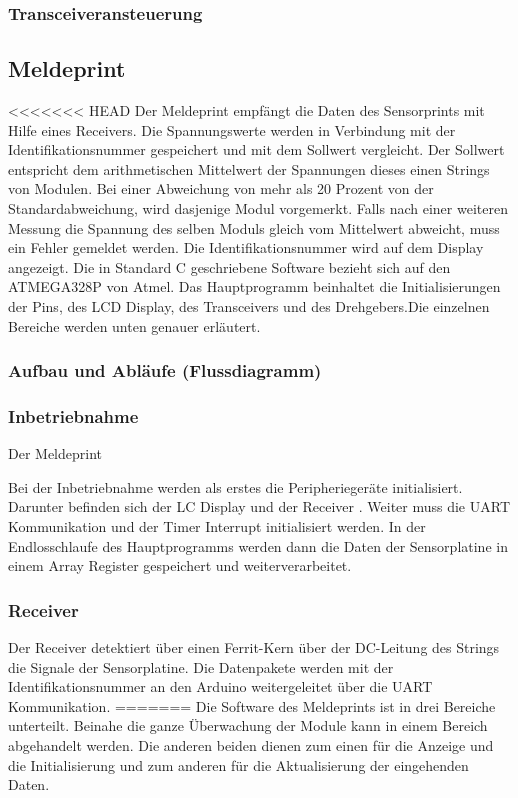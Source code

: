\subsubsection{Transceiveransteuerung}
















\newpage
\subsection{Meldeprint}
<<<<<<< HEAD
Der Meldeprint empfängt die Daten des Sensorprints mit Hilfe eines Receivers. Die Spannungswerte werden in Verbindung mit der Identifikationsnummer gespeichert und mit dem Sollwert vergleicht. Der Sollwert entspricht dem arithmetischen Mittelwert der Spannungen dieses einen Strings von Modulen. Bei einer Abweichung von mehr als 20 Prozent von der Standardabweichung, wird dasjenige Modul vorgemerkt. Falls nach einer weiteren Messung die Spannung des selben Moduls gleich vom Mittelwert abweicht, muss ein Fehler gemeldet werden. Die Identifikationsnummer wird auf dem Display angezeigt. Die in Standard C geschriebene Software bezieht sich auf den ATMEGA328P von Atmel. Das Hauptprogramm beinhaltet die Initialisierungen der Pins, des LCD Display, des Transceivers und des Drehgebers.Die einzelnen Bereiche werden unten genauer erläutert.
\subsubsection{Aufbau und Abläufe (Flussdiagramm)}
\subsubsection{Inbetriebnahme}

Der Meldeprint

Bei der Inbetriebnahme werden als erstes die Peripheriegeräte initialisiert. Darunter befinden sich der LC Display und der Receiver . Weiter muss die UART Kommunikation und der Timer Interrupt initialisiert werden. In der Endlosschlaufe des Hauptprogramms werden dann die Daten der Sensorplatine in einem Array Register gespeichert und weiterverarbeitet.

\subsubsection{Receiver}
Der Receiver detektiert über einen Ferrit-Kern über der DC-Leitung des Strings die Signale der Sensorplatine. Die Datenpakete werden mit der Identifikationsnummer an den Arduino weitergeleitet über die UART Kommunikation.
=======
Die Software des Meldeprints ist in drei Bereiche unterteilt. Beinahe die ganze Überwachung der Module kann in einem Bereich abgehandelt werden. Die anderen beiden dienen zum einen für die Anzeige und die Initialisierung und zum anderen für die Aktualisierung der eingehenden Daten.

